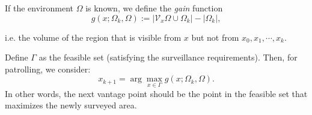 \documentclass[11pt,english]{article}
\begin{document}
If the environment $\Omega$ is known, we define the \emph{gain} function
$$g(x;\Omega_k, \Omega) := |   \mathcal{V}_x \Omega \cup \Omega_k| - |\Omega_k |, $$

i.e. the volume of the region that is visible from $x$ but not from $x_0,x_1,\cdots,x_{k}$. 

Define $\Gamma$ as the feasible set (satisfying the surveillance requirements).
Then, for patrolling, we consider:
\begin{equation} x_{k+1} = \arg \max_{x\in \Gamma} g(x;\Omega_k, \Omega).\end{equation}
In other words, the next vantage point should be the point in the feasible set that maximizes the newly surveyed area. 
\end{document}
